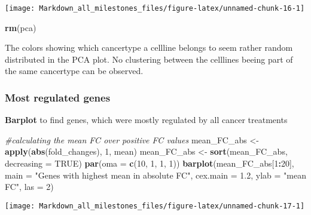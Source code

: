 \documentclass[]{article}
\newenvironment{Shaded}{\begin{snugshade}}{\end{snugshade}}
\newcommand{\CommentTok}[1]{\textcolor[rgb]{0.56,0.35,0.01}{\textit{#1}}}
\newcommand{\DataTypeTok}[1]{\textcolor[rgb]{0.13,0.29,0.53}{#1}}
\newcommand{\DecValTok}[1]{\textcolor[rgb]{0.00,0.00,0.81}{#1}}
\newcommand{\FloatTok}[1]{\textcolor[rgb]{0.00,0.00,0.81}{#1}}
\newcommand{\KeywordTok}[1]{\textcolor[rgb]{0.13,0.29,0.53}{\textbf{#1}}}
\newcommand{\NormalTok}[1]{#1}
\newcommand{\OperatorTok}[1]{\textcolor[rgb]{0.81,0.36,0.00}{\textbf{#1}}}
\newcommand{\OtherTok}[1]{\textcolor[rgb]{0.56,0.35,0.01}{#1}}
\newcommand{\StringTok}[1]{\textcolor[rgb]{0.31,0.60,0.02}{#1}}
\begin{document}
\begin{center}\texttt{[image: Markdown\_all\_milestones\_files/figure-latex/unnamed-chunk-16-1]} \end{center}

\begin{Shaded}
\begin{Highlighting}[]
\KeywordTok{rm}\NormalTok{(pca)}
\end{Highlighting}
\end{Shaded}

The colors showing which cancertype a cellline belongs to seem rather
random distributed in the PCA plot. No clustering between the celllines
beeing part of the same cancertype can be observed.

\hypertarget{most-regulated-genes}{%
\subsubsection{Most regulated genes}\label{most-regulated-genes}}

\textbf{Barplot} to find genes, which were mostly regulated by all
cancer treatments

\begin{Shaded}
\begin{Highlighting}[]
\CommentTok{#calculating the mean FC over positive FC values}
\NormalTok{mean_FC_abs <-}\StringTok{ }\KeywordTok{apply}\NormalTok{(}\KeywordTok{abs}\NormalTok{(fold_changes), }\DecValTok{1}\NormalTok{, mean)}
\NormalTok{mean_FC_abs <-}\StringTok{ }\KeywordTok{sort}\NormalTok{(mean_FC_abs, }\DataTypeTok{decreasing =} \OtherTok{TRUE}\NormalTok{)}
\KeywordTok{par}\NormalTok{(}\DataTypeTok{oma =} \KeywordTok{c}\NormalTok{(}\DecValTok{10}\NormalTok{, }\DecValTok{1}\NormalTok{, }\DecValTok{1}\NormalTok{, }\DecValTok{1}\NormalTok{))}
\KeywordTok{barplot}\NormalTok{(mean_FC_abs[}\DecValTok{1}\OperatorTok{:}\DecValTok{20}\NormalTok{], }
        \DataTypeTok{main =} \StringTok{"Genes with highest mean in absolute FC"}\NormalTok{,}
        \DataTypeTok{cex.main =} \FloatTok{1.2}\NormalTok{,}
        \DataTypeTok{ylab =} \StringTok{"mean FC"}\NormalTok{, }
        \DataTypeTok{las =} \DecValTok{2}\NormalTok{)}
\end{Highlighting}
\end{Shaded}

\begin{center}\texttt{[image: Markdown\_all\_milestones\_files/figure-latex/unnamed-chunk-17-1]} \end{center}
\end{document}
